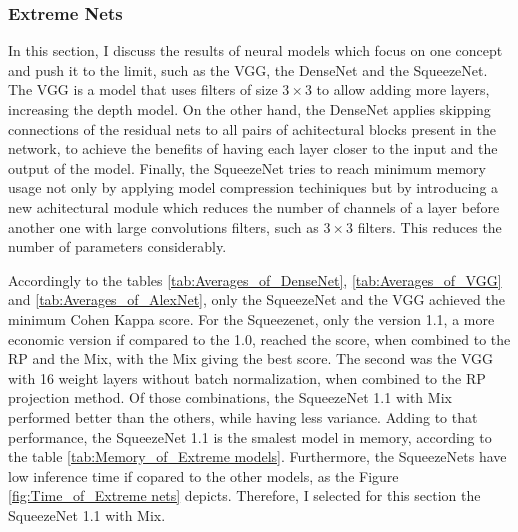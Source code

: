 




\FloatBarrier

\subsubsection{Extreme Nets}

In this section, I discuss the results of neural models which focus on one concept and push it to the limit, such as the VGG, the DenseNet and the SqueezeNet. The VGG is a model that uses filters of size $3\times 3$ to allow adding more layers, increasing the depth model. On the other hand, the DenseNet applies skipping connections of the residual nets to all pairs of achitectural blocks present in the network, to achieve the benefits of having each layer closer to the input and the output of the model. Finally, the SqueezeNet tries to reach minimum memory usage not only by applying model compression techiniques but by introducing a new achitectural module which reduces the number of channels of a layer before another one with large convolutions filters, such as $3 \times 3$ filters. This reduces the number of parameters considerably.

Accordingly to the tables \ref{tab:Averages_of_DenseNet}, \ref{tab:Averages_of_VGG} and \ref{tab:Averages_of_AlexNet}, only the SqueezeNet and the VGG achieved the minimum Cohen Kappa score. For the Squeezenet, only the version 1.1, a more economic version if compared to the 1.0, reached the score, when combined to the \gls{RP} and the \gls{Mix}, with the \gls{Mix} giving the best score. The second was the VGG with 16 weight layers without batch normalization, when combined to the \gls{RP} projection method. Of those combinations, the SqueezeNet 1.1 with \gls{Mix} performed better than the others, while having less variance. Adding to that performance, the SqueezeNet 1.1 is the smalest model in memory, according to the table \ref{tab:Memory_of_Extreme models}. Furthermore, the SqueezeNets have low inference time if copared to the other models, as the Figure \ref{fig:Time_of_Extreme nets} depicts. Therefore, I selected for this section the SqueezeNet 1.1 with \gls{Mix}.




